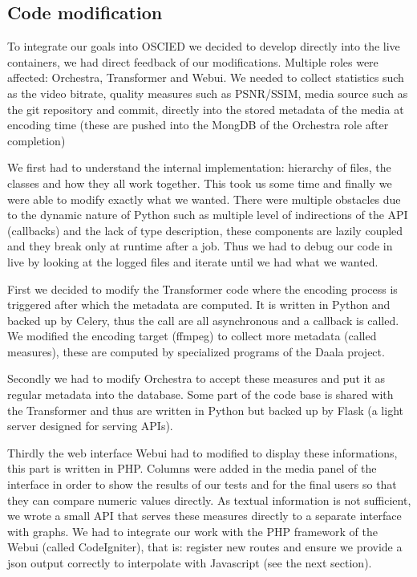 \documentclass[a4paper,12pt]{article}
\begin{document}

\subsection{Code modification}
To integrate our goals into OSCIED we decided to develop directly into the live
containers, we had direct feedback of our modifications.  Multiple roles were
affected: Orchestra, Transformer and Webui.  We needed to collect statistics
such as the video bitrate, quality measures such as PSNR/SSIM, media source such
as the git repository and commit, directly into the stored metadata of the media
at encoding time (these are pushed into the MongDB of the Orchestra role after
completion)

We first had to understand the internal implementation: hierarchy of files, the
classes and how they all work together.  This took us some time and finally we
were able to modify exactly what we wanted.  There were multiple obstacles due
to the dynamic nature of Python such as multiple level of indirections of the
API (callbacks) and the lack of type description, these components are lazily
coupled and they break only at runtime after a job.  Thus we had to debug our
code in live by looking at the logged files and iterate until we had what we
wanted.

First we decided to modify the Transformer code where the encoding process is
triggered after which the metadata are computed.  It is written in Python and
backed up by Celery, thus the call are all asynchronous and a callback is
called.  We modified the encoding target (ffmpeg) to collect more metadata
(called measures), these are computed by specialized programs of the Daala
project.

Secondly we had to modify Orchestra to accept these measures and put it as
regular metadata into the database. Some part of the code base is shared with
the Transformer and thus are written in Python but backed up by Flask (a light
server designed for serving APIs).

Thirdly the web interface Webui had to modified to display these informations,
this part is written in PHP.  Columns were added in the media panel of the
interface in order to show the results of our tests and for the final users
so that they can compare numeric values directly.  As textual information is not
sufficient, we wrote a small API that serves these measures directly to a
separate interface with graphs.  We had to integrate our work with the PHP
framework of the Webui (called CodeIgniter), that is: register new routes and
ensure we provide a json output correctly to interpolate with Javascript (see
the next section).
\end{document}
